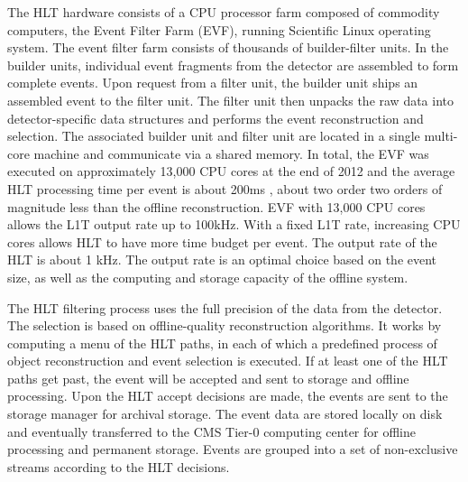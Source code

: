 The HLT hardware consists of a CPU processor farm composed of commodity computers, the Event Filter Farm (EVF), running Scientific Linux operating system. The event filter farm consists of thousands of builder-filter units. In the builder units, individual event fragments from the detector are assembled to form complete events. Upon request from a filter unit, the builder unit ships an assembled event to the filter unit. The filter unit then unpacks the raw data into detector-specific data structures and performs the event reconstruction and selection. The associated builder unit and filter unit are located in a single multi-core machine and communicate via a shared memory. In total, the EVF was executed on approximately 13,000 CPU cores at the end of 2012 and the average HLT processing time per event is about 200\unit{ms} \cite{Trocino:2014jya}, about two order two orders of magnitude less than the offline reconstruction. EVF with 13,000 CPU cores allows the L1T output rate up to 100\unit{kHz}. With a fixed L1T rate, increasing CPU cores allows HLT to have more time budget per event. The output rate of the HLT is about 1 kHz. The output rate is an optimal choice based on the event size, as well as the computing and storage capacity of the offline system.

The HLT filtering process uses the full precision of the data from the detector. The selection is based on offline-quality reconstruction algorithms. It works by computing a menu of the HLT paths, in each of which a predefined process of object reconstruction and event selection is executed. If at least one of the HLT paths get past, the event will be accepted and sent to storage and offline processing. Upon the HLT accept decisions are made, the events are sent to the storage manager for archival storage. The event data are stored locally on disk and eventually transferred to the CMS Tier-0 computing center for offline processing and permanent storage. Events are grouped into a set of non-exclusive streams according to the HLT decisions.
